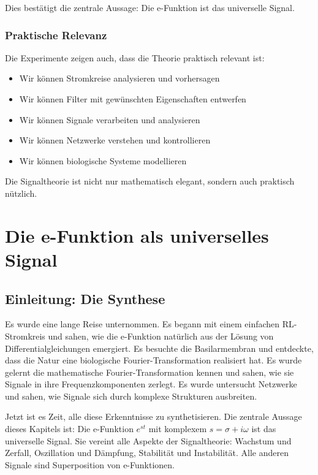 ﻿\documentclass[a4paper,12pt]{report}
\theoremstyle{definition}
\begin{document}
	Dies bestätigt die zentrale Aussage: Die e-Funktion ist das universelle Signal.
	
	\subsection{Praktische Relevanz}
	
	Die Experimente zeigen auch, dass die Theorie praktisch relevant ist:
	\begin{itemize}
		\item[-] Wir können Stromkreise analysieren und vorhersagen
		\item[-] Wir können Filter mit gewünschten Eigenschaften entwerfen
		\item[-] Wir können Signale verarbeiten und analysieren
		\item[-] Wir können Netzwerke verstehen und kontrollieren
		\item[-] Wir können biologische Systeme modellieren
	\end{itemize}
	
	Die Signaltheorie ist nicht nur mathematisch elegant, sondern auch praktisch nützlich.
	
	\chapter{Die e-Funktion als universelles Signal}
	
	\section{Einleitung: Die Synthese}
	
	Es wurde eine lange Reise unternommen. Es begann mit einem einfachen RL-Strom\-kreis und sahen, wie die e-Funktion natürlich aus der Lösung von Differentialgleichungen emergiert. Es besuchte die Basilarmembran und entdeckte, dass die Natur eine biologische Fourier-Transformation realisiert hat. Es wurde gelernt die mathematische Fourier-Transformation kennen und sahen, wie sie Signale in ihre Frequenzkomponenten zerlegt. Es wurde untersucht Netzwerke und sahen, wie Signale sich durch komplexe Strukturen ausbreiten.
	
	Jetzt ist es Zeit, alle diese Erkenntnisse zu synthetisieren. Die zentrale Aussage dieses Kapitels ist: Die e-Funktion $e^{st}$ mit komplexem $s = \sigma + i\omega$ ist das universelle Signal. Sie vereint alle Aspekte der Signaltheorie: Wachstum und Zerfall, Oszillation und Dämpfung, Stabilität und Instabilität. Alle anderen Signale sind Superposition von e-Funktionen.
	
\end{document}
